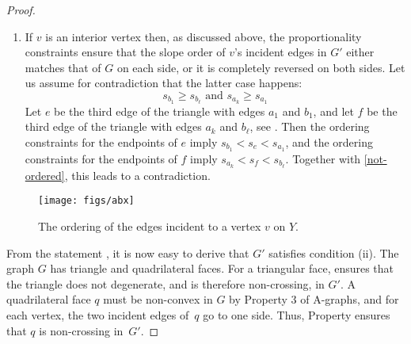 \begin{proof}
\begin{enumerate}
\begin{enumerate}
\item If $v$ is an interior vertex then,
  as discussed above, the proportionality constraints ensure that the
  slope order of $v$'s incident edges in $G'$ either matches that of
  $G$ on each side, or it is completely reversed on both sides.
  Let us assume for contradiction that the latter case happens:
  \begin{equation}
    \label{eq:not-ordered}
    s_{b_1}\ge s_{b_\ell}
    \text{ and }
    s_{a_k}\ge s_{a_1}
  \end{equation}
  Let $e$ be the third edge of the triangle with edges $a_1$ and
  $b_1$, and let $f$ be the third edge of the triangle with edges
  $a_k$ and $b_\ell$, see .
			Then the ordering constraints for the endpoints of $e$ imply
			\begin{math}
			s_{b_1}<s_e<s_{a_1}
			\end{math},
			and the ordering constraints for the endpoints of $f$ imply
			\begin{math}
			s_{a_k}<s_f<s_{b_\ell}
			\end{math}.
			Together with \eqref{not-ordered}, this leads to a contradiction.
		\end{enumerate}
\end{enumerate}

\begin{figure}
  \centering
  {\texttt{[image: figs/abx]}}
  \caption{The ordering of the edges incident to a vertex $v$ on $Y$.}
\end{figure}


From the statement \thetag{$*$}, it is now easy to derive that
$G'$ satisfies condition (ii).
The graph $G$ has triangle and quadrilateral faces.
%
For a triangular face, \thetag{$*$} ensures that the triangle does not
degenerate, and is therefore non-crossing, in $G'$.
A quadrilateral face $q$ must be non-convex in $G$ by Property 3 of
A-graphs, and for each vertex, the two incident edges of~$q$ go to one
side. Thus, Property \thetag{$*$} ensures that $q$ is non-crossing in~$G'$.





\end{proof}
